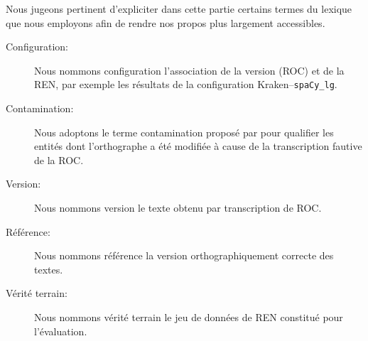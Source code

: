 Nous jugeons pertinent d'expliciter dans cette partie certains termes du lexique que nous employons afin de rendre nos propos plus largement accessibles.

\begin{description}
    \item [Configuration:] Nous nommons configuration l'association de la version (ROC) et de la REN, par exemple les résultats de la configuration Kraken--\texttt{spaCy\_lg}.
    \item [Contamination:] Nous adoptons le terme contamination proposé par \cite{hamdi:hal-03615997} pour qualifier les entités dont l'orthographe a été modifiée à cause de la transcription fautive de la ROC.
    \item [Version:] Nous nommons version le texte obtenu par transcription de ROC.
    \item [Référence:] Nous nommons référence la version orthographiquement correcte des textes.
    \item [Vérité terrain:] Nous nommons vérité terrain le jeu de données de REN constitué pour l'évaluation. 
\end{description}



